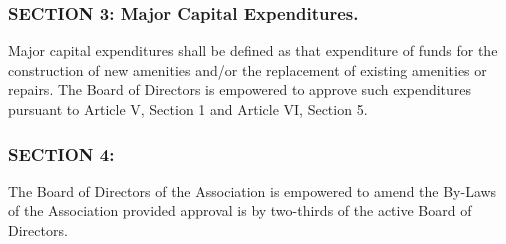 \subsubsection{SECTION 3: Major Capital Expenditures.}
Major capital expenditures shall be defined as that expenditure of funds
for the construction of new amenities and/or the replacement of existing
amenities or repairs. The Board of Directors is empowered to approve such
expenditures pursuant to Article V, Section 1 and Article VI, Section 5.

\subsubsection{SECTION 4:}
The Board of Directors of the Association is empowered to amend the
By-Laws of the Association provided approval is by two-thirds of the
active Board of Directors.


